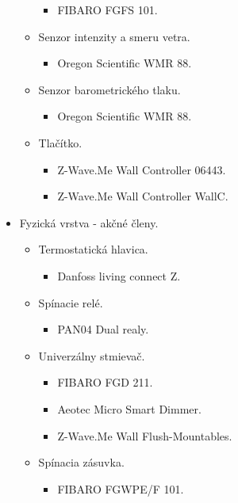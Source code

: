 \begin{itemize}
\begin{itemize}
\begin{itemize}
        \item FIBARO FGFS 101.        
       \end{itemize}                
    \item Senzor intenzity a smeru vetra.    
      \begin{itemize}      
        \item Oregon Scientific WMR 88. 
       \end{itemize}         
    \item Senzor barometrického tlaku.        
      \begin{itemize}      
        \item Oregon Scientific WMR 88. 
       \end{itemize}             
    \item Tlačítko.     
      \begin{itemize}      
        \item Z-Wave.Me Wall Controller 06443. 
        \item Z-Wave.Me Wall Controller WallC.
       \end{itemize}             
  \end{itemize}
\item Fyzická vrstva - akčné členy.
  \begin{itemize}
    \item Termostatická hlavica.
      \begin{itemize}      
        \item Danfoss living connect Z. 
       \end{itemize}     
    \item Spínacie relé.
      \begin{itemize}      
        \item PAN04 Dual realy.         
       \end{itemize}     
    \item Univerzálny stmievač.    
      \begin{itemize}      
        \item FIBARO FGD 211.         
        \item Aeotec Micro Smart Dimmer. 
        \item Z-Wave.Me Wall Flush-Mountables.                 
       \end{itemize}         
    \item Spínacia zásuvka.     
      \begin{itemize}      
        \item FIBARO FGWPE/F 101.         

\end{itemize}
\end{itemize}
\end{itemize}
